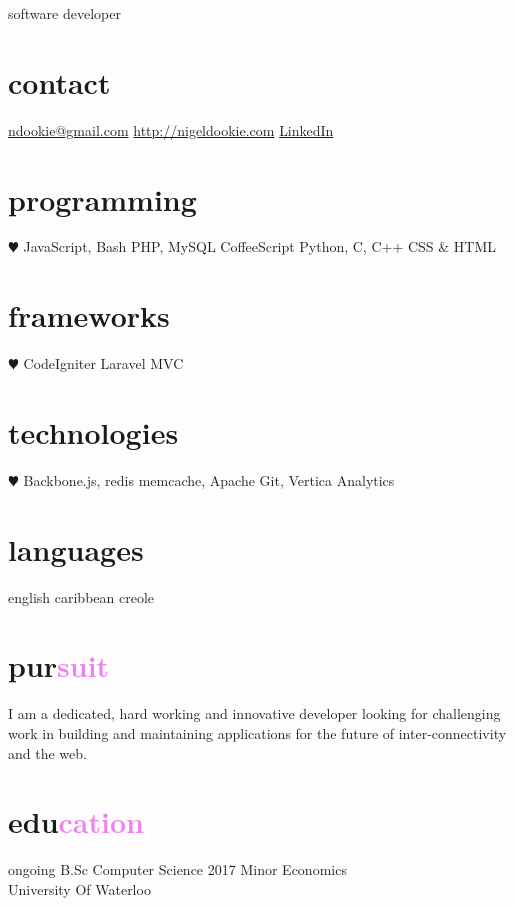 \documentclass[]{friggeri-cv}
\begin{document}
       {software developer}


\begin{aside}
  \section{contact}
    \href{mailto:ndookie@gmail.com}{ndookie@gmail.com}
    \href{http://nigeldookie.com}{http://nigeldookie.com}
    \href{https://www.linkedin.com/in/nigel-dookie-88726440}{LinkedIn}
  \section{programming}
    {\color{red} $\varheartsuit$} JavaScript, Bash
    PHP, MySQL
    CoffeeScript
    Python, C, C++
    CSS \& HTML
  \section{frameworks}
    {\color{red} $\varheartsuit$} CodeIgniter
    Laravel
    MVC
  \section{technologies}
    {\color{red} $\varheartsuit$} Backbone.js, redis
    memcache, Apache
    Git, Vertica Analytics
  \section{languages}
    english
    caribbean creole
\end{aside}

\section{pur\textcolor{violet}{suit}}
    I am a dedicated, hard working and innovative developer looking for challenging work in building and maintaining applications for the future of inter-connectivity and the web.



\section{edu\textcolor{violet}{cation}}

\begin{entrylist}
  \entry
    {ongoing}
    {B.Sc {\normalfont Computer Science}}
    {2017}
    {Minor Economics \\University Of Waterloo}

\end{entrylist}
\end{document}
